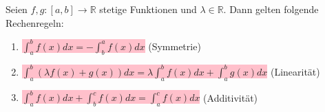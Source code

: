 \documentclass[12pt]{article}
\newcommand{\R}{\mathbb{R}} %
\newenvironment{definition}[2][Definition]{\begin{trivlist}
        \item[\hskip \labelsep {\bfseries #1}\hskip \labelsep {\bfseries #2.}]}{\flushright{$\square$}\end{trivlist}}
\begin{document}
\begin{definition}{[Rechenregeln für Integrale]}
    Seien $f,g: [a,b] \to \R$ stetige Funktionen und $\lambda \in \R$. Dann gelten folgende Rechenregeln:
    \begin{enumerate}
        \item \colorbox{pink}{$\displaystyle\int_{a}^{b}f(x)dx=-\displaystyle\int_{b}^{a}f(x)dx$} \hfill (Symmetrie)
        \item \colorbox{pink}{$\displaystyle\int_{a}^{b}(\lambda f(x)+g(x))dx=\lambda \displaystyle\int_{a}^{b}f(x)dx+\displaystyle\int_{a}^{b}g(x)dx$} \hfill (Linearität)
        \item \colorbox{pink}{$\displaystyle\int_{a}^{b}f(x)dx+\displaystyle\int_{b}^{c}f(x)dx=\displaystyle\int_{a}^{c}f(x)dx$} \hfill (Additivität)
    \end{enumerate}
\end{definition}
\end{document}

